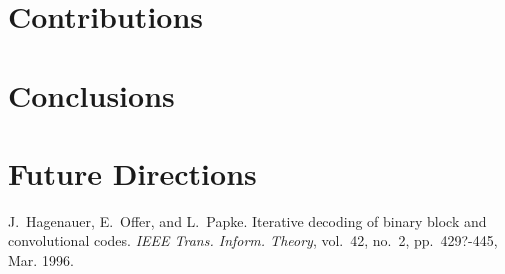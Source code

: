 \documentclass[journal, a4paper]{IEEEtran}
\begin{document}
\section{Contributions}

\section{Conclusions}

\section{Future Directions}


\begin{thebibliography}{5}

	J.~Hagenauer, E.~Offer, and L.~Papke. Iterative decoding of binary block
	and convolutional codes. {\em IEEE Trans. Inform. Theory},
	vol.~42, no.~2, pp.~429?-445, Mar. 1996.

\end{thebibliography}

\end{document}
